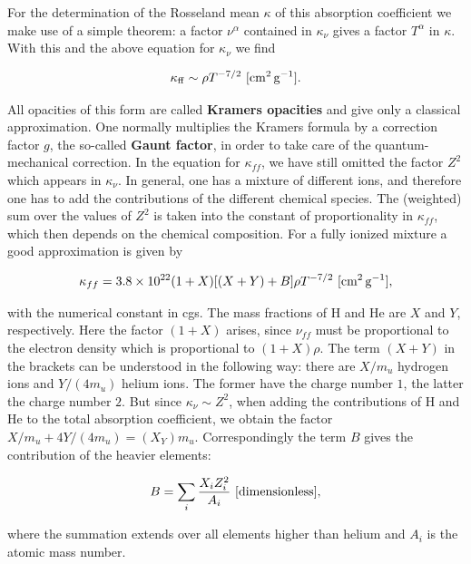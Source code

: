 \documentclass[a4paper,10pt]{article}
\begin{document}
{\noindent}For the determination of the Rosseland mean $\kappa$ of this absorption coefficient we make use of a simple theorem: a factor $\nu^\alpha$ contained in $\kappa_\nu$ gives a factor $T^\alpha$ in $\kappa$. With this and the above equation for $\kappa_\nu$ we find

\begin{align*}
    \kappa_{\rm ff} \sim \rho T^{-7/2} ~ [{\rm cm^2\,g^{-1}}].
\end{align*}

{\noindent}All opacities of this form are called \textbf{Kramers opacities} and give only a classical approximation. One normally multiplies the Kramers formula by a correction factor $g$, the so-called \textbf{Gaunt factor}, in order to take care of the quantum-mechanical correction. In the equation for $\kappa_{ff}$, we have still omitted the factor $Z^2$ which appears in $\kappa_\nu$. In general, one has a mixture of different ions, and therefore one has to add the contributions of the different chemical species. The (weighted) sum over the values of $Z^2$ is taken into the constant of proportionality in $\kappa_{ff}$, which then depends on the chemical composition. For a fully ionized mixture a good approximation is given by

\begin{align*}
    \kappa_{ff} = 3.8\times10^{22} (1+X)[(X+Y)+B]\rho T^{-7/2} ~ [{\rm cm^2\,g^{-1}}],
\end{align*}

{\noindent}with the numerical constant in cgs. The mass fractions of H and He are $X$ and $Y$, respectively. Here the factor $(1+X)$ arises, since $\nu_{ff}$ must be proportional to the electron density which is proportional to $(1+X)\rho$. The term $(X+Y)$ in the brackets can be understood in the following way: there are $X/m_u$ hydrogen ions and $Y/(4m_u)$ helium ions. The former have the charge number $1$, the latter the charge number $2$. But since  $\kappa_\nu\sim Z^2$, when adding the contributions of H and He to the total absorption coefficient, we obtain the factor $X/m_u+4Y/(4m_u) = (X_Y)m_u$. Correspondingly the term $B$ gives the contribution of the heavier elements:

\begin{align*}
    B = \sum_i \frac{X_iZ_i^2}{A_i} ~ [{\rm dimensionless}],
\end{align*}

{\noindent}where the summation extends over all elements higher than helium and $A_i$ is the atomic mass number.
\end{document}
